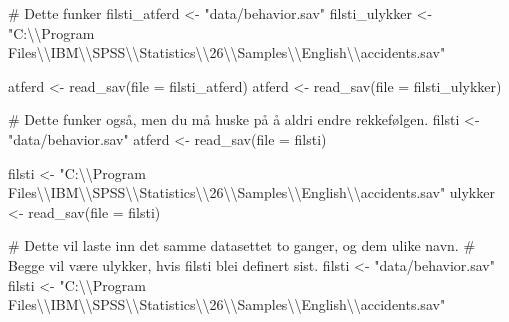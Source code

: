 \documentclass[
  letterpaper,
  DIV=11,
  numbers=noendperiod]{scrartcl}
\newenvironment{Shaded}{\begin{snugshade}}{\end{snugshade}}
\newcommand{\AttributeTok}[1]{\textcolor[rgb]{0.40,0.45,0.13}{#1}}
\newcommand{\CommentTok}[1]{\textcolor[rgb]{0.37,0.37,0.37}{#1}}
\newcommand{\FunctionTok}[1]{\textcolor[rgb]{0.28,0.35,0.67}{#1}}
\newcommand{\NormalTok}[1]{\textcolor[rgb]{0.00,0.23,0.31}{#1}}
\newcommand{\OtherTok}[1]{\textcolor[rgb]{0.00,0.23,0.31}{#1}}
\newcommand{\SpecialCharTok}[1]{\textcolor[rgb]{0.37,0.37,0.37}{#1}}
\newcommand{\StringTok}[1]{\textcolor[rgb]{0.13,0.47,0.30}{#1}}
\begin{document}
\begin{Shaded}
\begin{Highlighting}[]
\CommentTok{\# Dette funker}
\NormalTok{filsti\_atferd }\OtherTok{\textless{}{-}} \StringTok{"data/behavior.sav"}
\NormalTok{filsti\_ulykker }\OtherTok{\textless{}{-}} \StringTok{"C:}\SpecialCharTok{\textbackslash{}\textbackslash{}}\StringTok{Program Files}\SpecialCharTok{\textbackslash{}\textbackslash{}}\StringTok{IBM}\SpecialCharTok{\textbackslash{}\textbackslash{}}\StringTok{SPSS}\SpecialCharTok{\textbackslash{}\textbackslash{}}\StringTok{Statistics}\SpecialCharTok{\textbackslash{}\textbackslash{}}\StringTok{26}\SpecialCharTok{\textbackslash{}\textbackslash{}}\StringTok{Samples}\SpecialCharTok{\textbackslash{}\textbackslash{}}\StringTok{English}\SpecialCharTok{\textbackslash{}\textbackslash{}}\StringTok{accidents.sav"}

\NormalTok{atferd }\OtherTok{\textless{}{-}} \FunctionTok{read\_sav}\NormalTok{(}\AttributeTok{file =}\NormalTok{ filsti\_atferd)}
\NormalTok{atferd }\OtherTok{\textless{}{-}} \FunctionTok{read\_sav}\NormalTok{(}\AttributeTok{file =}\NormalTok{ filsti\_ulykker)}

\CommentTok{\# Dette funker også, men du må huske på å aldri endre rekkefølgen.}
\NormalTok{filsti }\OtherTok{\textless{}{-}} \StringTok{"data/behavior.sav"}
\NormalTok{atferd }\OtherTok{\textless{}{-}} \FunctionTok{read\_sav}\NormalTok{(}\AttributeTok{file =}\NormalTok{ filsti)}

\NormalTok{filsti }\OtherTok{\textless{}{-}} \StringTok{"C:}\SpecialCharTok{\textbackslash{}\textbackslash{}}\StringTok{Program Files}\SpecialCharTok{\textbackslash{}\textbackslash{}}\StringTok{IBM}\SpecialCharTok{\textbackslash{}\textbackslash{}}\StringTok{SPSS}\SpecialCharTok{\textbackslash{}\textbackslash{}}\StringTok{Statistics}\SpecialCharTok{\textbackslash{}\textbackslash{}}\StringTok{26}\SpecialCharTok{\textbackslash{}\textbackslash{}}\StringTok{Samples}\SpecialCharTok{\textbackslash{}\textbackslash{}}\StringTok{English}\SpecialCharTok{\textbackslash{}\textbackslash{}}\StringTok{accidents.sav"}
\NormalTok{ulykker }\OtherTok{\textless{}{-}} \FunctionTok{read\_sav}\NormalTok{(}\AttributeTok{file =}\NormalTok{ filsti)}

\CommentTok{\# Dette vil laste inn det samme datasettet to ganger, og dem ulike navn.}
\CommentTok{\# Begge vil være ulykker, hvis filsti blei definert sist.}
\NormalTok{filsti }\OtherTok{\textless{}{-}} \StringTok{"data/behavior.sav"}
\NormalTok{filsti }\OtherTok{\textless{}{-}} \StringTok{"C:}\SpecialCharTok{\textbackslash{}\textbackslash{}}\StringTok{Program Files}\SpecialCharTok{\textbackslash{}\textbackslash{}}\StringTok{IBM}\SpecialCharTok{\textbackslash{}\textbackslash{}}\StringTok{SPSS}\SpecialCharTok{\textbackslash{}\textbackslash{}}\StringTok{Statistics}\SpecialCharTok{\textbackslash{}\textbackslash{}}\StringTok{26}\SpecialCharTok{\textbackslash{}\textbackslash{}}\StringTok{Samples}\SpecialCharTok{\textbackslash{}\textbackslash{}}\StringTok{English}\SpecialCharTok{\textbackslash{}\textbackslash{}}\StringTok{accidents.sav"}


\end{Highlighting}
\end{Shaded}
\end{document}
